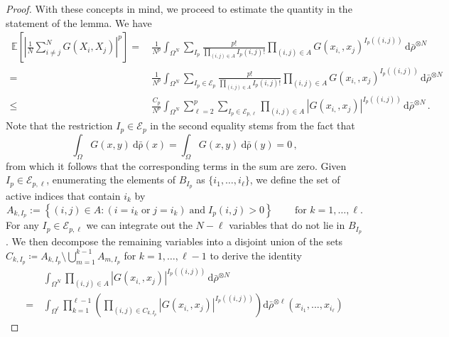 \documentclass[10pt,a4paper]{amsart}
\begin{document}
\begin{proof}
With these concepts in mind, we proceed to estimate the quantity in the statement of the lemma. We have
\begin{align}
 \, \mathbb{{E}}\left[\left|\frac{1}{N}\sum_{i\neq j}^{N}G(X_{i},X_{j})\right|^{p}\right]
=&\, \frac{{1}}{N^{p}}\int_{\Omega^N}\sum_{I_{p}}\frac{p!}{\prod_{(i,j)\in A}I_p(i,j)! }\prod_{(i,j)\in A}G(x_{i,},x_{j})^{I_p((i,j))}\,\mathrm{{d}}\bar\rho^{\otimes N} \\
=&\, \frac{{1}}{N^{p}}\int_{\Omega^N}\sum_{I_{p}\in\mathcal{{E}}_{p}}\frac{p!}{\prod_{(i,j)\in A}I_p(i,j)! } \prod_{(i,j)\in A}G(x_{i,},x_{j})^{I_p((i,j))}\,\mathrm{{d}}\bar\rho^{\otimes N} \\
\leq & \, \frac{C_p}{N^{p}}\int_{\Omega^N}\sum_{\ell=2}^p\sum_{I_{p}\in\mathcal{{E}}_{p,\ell}} \prod_{(i,j)\in A}|G(x_{i,},x_{j})|^{I_p((i,j))}\,\mathrm{{d}}\bar\rho^{\otimes N} \, .\label{eq:termtosplit}
\end{align}
Note that the restriction $I_p\in\mathcal{E}_p$ in the second equality stems from the fact that 
\begin{equation}
\int_{\Omega}G(x,y)\:\mathrm{{d}\bar\rho}(x)=\int_{\Omega}G(x,y)\:\mathrm{{d}\bar\rho}(y)=0 \, ,
\end{equation}
from which it follows that the corresponding terms in the sum are zero. Given $I_{p} \in \mathcal{E}_{p,\ell}$, enumerating the elements of $B_{I_p}$ as $\{i_1,\dots,i_\ell\}$, we define the set of active indices that contain $i_k$ by
\begin{equation}
A_{k,I_p}:= \left\{ (i,j) \in A: (i =i_k \;\mbox{or}\; j=i_k)\;\mbox{and}\; I_p(i,j)>0 \right\} \, \qquad\mbox{for $k=1,\dots,\ell$.}
\end{equation} 
For any $I_p \in \mathcal{E}_{p,\ell}$ we can integrate out the $N-\ell$ variables that do not lie in $B_{I_p}$. We then decompose the remaining variables into a disjoint union of the sets $C_{k,I_p}\coloneqq A_{k,I_p}\setminus \bigcup_{m=1}^{k-1}A_{m,I_p}$ for $k=1,\dots,\ell-1$ to derive the identity
\begin{align}
&\, \int_{\Omega^N}\prod_{(i,j)\in A}|G(x_{i,},x_{j})|^{I_p((i,j))}\,\mathrm{{d}}\bar\rho^{\otimes N}\\
= & \, \int_{\Omega^{\ell}}\prod_{k=1 }^{\ell-1}\left(\prod_{(i,j)\in C_{k,I_p}}|G(x_{i,},x_{j})|^{I_p((i,j))}\right)\mathrm{{d}}\bar\rho^{\otimes \ell}(x_{i_1},...,x_{i_\ell})\label{eq:breakingupA}
\end{align}


\end{proof}
\end{document}
